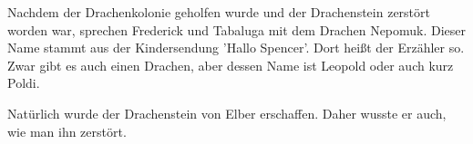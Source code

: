 \begin{kommentar}
Nachdem der Drachenkolonie geholfen wurde und der Drachenstein zerstört worden war, sprechen Frederick und Tabaluga mit dem Drachen Nepomuk. Dieser Name stammt aus der Kindersendung 'Hallo Spencer'. Dort heißt der Erzähler so. Zwar gibt es auch einen Drachen, aber dessen Name ist Leopold oder auch kurz Poldi.
\end{kommentar}

\begin{kommentar}
Natürlich wurde der Drachenstein von Elber erschaffen. Daher wusste er auch, wie man ihn zerstört.
\end{kommentar}
